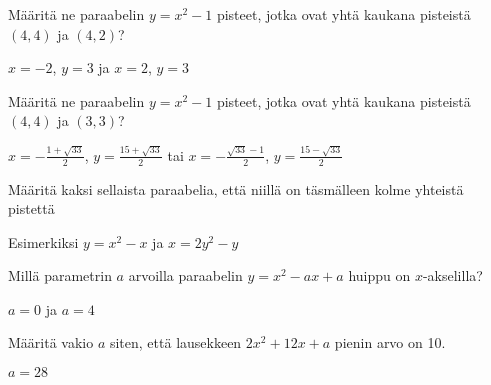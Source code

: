 \begin{tehtavasivu}
\begin{tehtava}
Määritä ne paraabelin $y=x^2-1$ pisteet, jotka ovat yhtä kaukana pisteistä $(4, 4)$ ja $(4, 2)$?
\begin{vastaus}
$x=-2$, $y=3$ ja $x=2$, $y=3$
\end{vastaus}
\end{tehtava}

\begin{tehtava}
Määritä ne paraabelin $y=x^2-1$ pisteet, jotka ovat yhtä kaukana pisteistä $(4, 4)$ ja $(3, 3)$?
\begin{vastaus}
$x = -\frac{1+\sqrt{33}}{2}$,   $y = \frac{15+\sqrt{33}}{2}$ tai $x = -\frac{\sqrt{33}-1}{2}$,   $y = \frac{15-\sqrt{33}}{2}$
\end{vastaus}
\end{tehtava}



\begin{tehtava}
Määritä kaksi sellaista paraabelia, että niillä on täsmälleen kolme yhteistä pistettä
\begin{vastaus}
Esimerkiksi $y=x^2-x$ ja  $x=2y^2-y$
\end{vastaus}
\end{tehtava}

\begin{tehtava}
Millä parametrin $a$ arvoilla paraabelin $y=x^2-ax+a$ huippu on $x$-akselilla?
\begin{vastaus}
$a=0$ ja $a=4$
\end{vastaus}
\end{tehtava}

\begin{tehtava}
Määritä vakio $a$ siten, että lausekkeen $2x^2+12x+a$ pienin arvo on 10.
\begin{vastaus}
$a=28$
\end{vastaus}
\end{tehtava}


\end{tehtavasivu}
